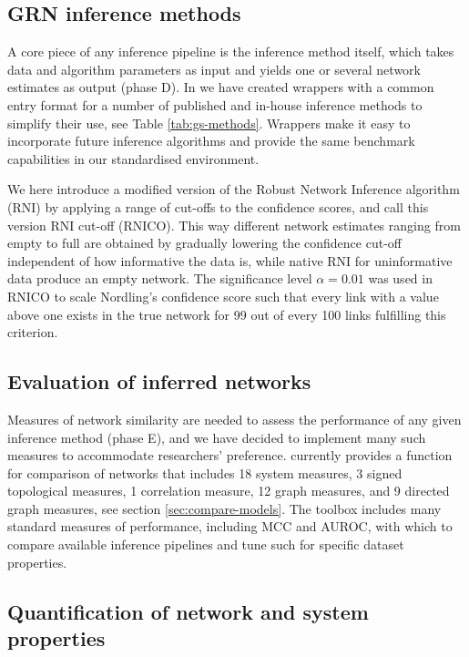 \label{sec:data-analysis}

\subsection{GRN inference methods}
\label{sec:inference-methods}
A core piece of any inference pipeline is the inference method itself, which takes data and algorithm parameters as input and yields one or several network estimates as output (phase D). In \gs we have created wrappers with a common entry format for a number of published and in-house inference methods to simplify their use, see Table \ref{tab:gs-methods}. Wrappers make it easy to incorporate future inference algorithms and provide the same benchmark capabilities in our standardised environment.

We here introduce a modified version of the Robust Network Inference algorithm (RNI)\citep{Nordling2013phdthesis} by applying a range of cut-offs to the confidence scores, and call this version RNI cut-off (RNICO). This way different network estimates ranging from empty to full are obtained by gradually lowering the confidence cut-off independent of how informative the data is, while native RNI for uninformative data produce an empty network.  
The significance level \(\alpha=0.01\) was used in RNICO to scale Nordling's confidence score such that every link with a value above one exists in the true network for 99 out of every 100 links fulfilling this criterion. 

\subsection{Evaluation of inferred networks}
\label{sec:evaluation_of_networks}

Measures of network similarity are needed to assess the performance of any given inference method (phase E), and we have decided to implement many such measures to accommodate researchers' preference.
\gs currently provides a function for comparison of networks that includes 18 system measures, 3 signed topological measures, 1 correlation measure, 12 graph measures, and 9 directed graph measures, see section \ref{sec:compare-models}.
The \gs toolbox includes many standard measures of performance, including MCC and AUROC, with which to compare available inference pipelines and tune such for specific dataset properties.


\subsection{Quantification of network and system properties}
\label{sec:quantification_network_properties}

